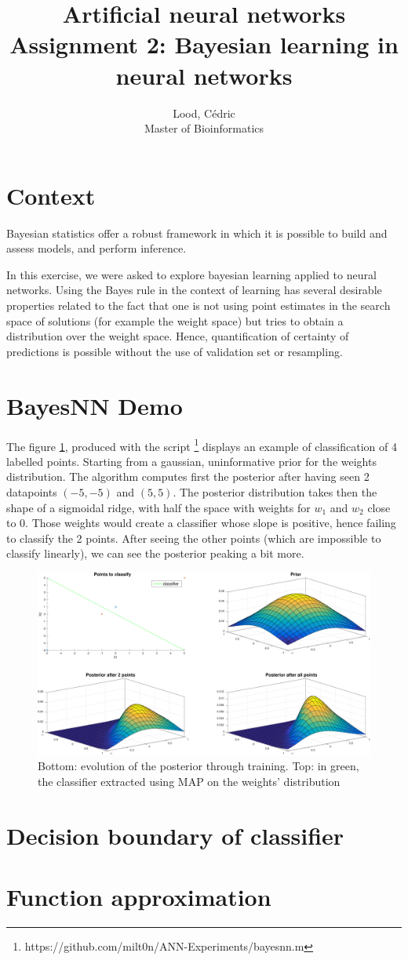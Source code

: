 \documentclass[11pt, a4paper]{article}
\title{ \huge Artificial neural networks \\ 
  { \large Assignment 2: Bayesian learning in neural networks }}
\author{
        Lood, Cédric \\
        \small Master of Bioinformatics
}
\begin{document}
\maketitle

\section{Context}
Bayesian statistics offer a robust framework in which it is possible
to build and assess models, and perform inference.

In this exercise, we were asked to explore bayesian learning applied
to neural networks. Using the Bayes rule in the context of learning
has several desirable properties related to the fact that one is not
using point estimates in the search space of solutions (for example
the weight space) but tries to obtain a distribution over the weight
space. Hence, quantification of certainty of predictions is possible
without the use of validation set or resampling.

\section{BayesNN Demo}

The figure \ref{fig:bayesnn}, produced with the script \footnote{
  https://github.com/milt0n/ANN-Experiments/bayesnn.m} displays an
example of classification of 4 labelled points. Starting from a
gaussian, uninformative prior for the weights distribution. The
algorithm computes first the posterior after having seen 2 datapoints
$(-5,-5)$ and $(5,5)$. The posterior distribution takes then the shape
of a sigmoidal ridge, with half the space with weights for $w_1$ and
$w_2$ close to $0$. Those weights would create a classifier whose
slope is positive, hence failing to classify the 2 points. After
seeing the other points (which are impossible to classify linearly),
we can see the posterior peaking a bit more.

\begin{figure}[H]
    \centering
    \includegraphics[scale=.40]{bayesnn.pdf}
    \caption{Bottom: evolution of the posterior through training. Top:
      in green, the classifier extracted using MAP on the weights'
      distribution}
    \label{fig:bayesnn}
\end{figure}

\section{Decision boundary of classifier}

\section{Function approximation}
 

\end{document}
